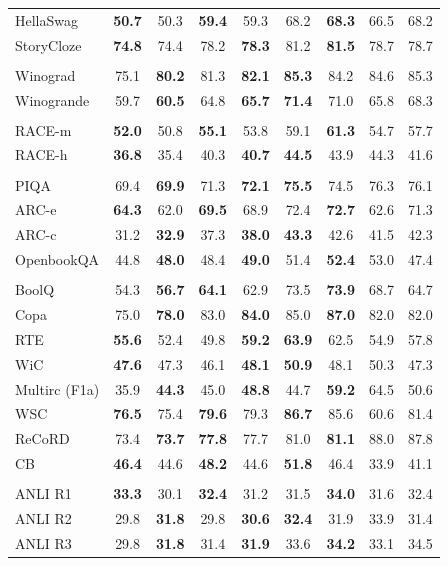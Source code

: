 \documentclass{article}
\begin{document}
\begin{table}
{\begin{tabular}{l|cc|cc|cc|cc}
    HellaSwag & \textbf{50.7} & 50.3 & \textbf{59.4} & 59.3 & 68.2 & \textbf{68.3} & 66.5 & 68.2 \\
    StoryCloze & \textbf{74.8} & 74.4 & 78.2 & \textbf{78.3} & 81.2 & \textbf{81.5} & 78.7 & 78.7 \\ \\
    Winograd & 75.1 & \textbf{80.2} & 81.3 & \textbf{82.1} & \textbf{85.3} & 84.2 & 84.6 & 85.3 \\
    Winogrande & 59.7 & \textbf{60.5} & 64.8 & \textbf{65.7} & \textbf{71.4} & 71.0 & 65.8 & 68.3 \\ \\
    RACE-m & \textbf{52.0} & 50.8 & \textbf{55.1} & 53.8 & 59.1 & \textbf{61.3} & 54.7 & 57.7 \\
    RACE-h & \textbf{36.8} & 35.4 & 40.3 & \textbf{40.7} & \textbf{44.5} & 43.9 & 44.3 & 41.6 \\ \\
    PIQA & 69.4 & \textbf{69.9} & 71.3 & \textbf{72.1} & \textbf{75.5} & 74.5 & 76.3 & 76.1 \\
    ARC-e & \textbf{64.3} & 62.0 & \textbf{69.5} & 68.9 & 72.4 & \textbf{72.7} & 62.6 & 71.3 \\
    ARC-c & 31.2 & \textbf{32.9} & 37.3 & \textbf{38.0} & \textbf{43.3} & 42.6 & 41.5 & 42.3 \\
    OpenbookQA & 44.8 & \textbf{48.0} & 48.4 & \textbf{49.0} & 51.4 & \textbf{52.4} & 53.0 & 47.4 \\ \\
    BoolQ & 54.3 & \textbf{56.7} & \textbf{64.1} & 62.9 & 73.5 & \textbf{73.9} & 68.7 & 64.7 \\
    Copa & 75.0 & \textbf{78.0} & 83.0 & \textbf{84.0} & 85.0 & \textbf{87.0} & 82.0 & 82.0 \\
    RTE & \textbf{55.6} & 52.4 & 49.8 & \textbf{59.2} & \textbf{63.9} & 62.5 & 54.9 & 57.8 \\
    WiC & \textbf{47.6} & 47.3 & 46.1 & \textbf{48.1} & \textbf{50.9} & 48.1 & 50.3 & 47.3 \\
    Multirc (F1a) & 35.9 & \textbf{44.3} & 45.0 & \textbf{48.8} & 44.7 & \textbf{59.2} & 64.5 & 50.6 \\
    WSC & \textbf{76.5} & 75.4 & \textbf{79.6} & 79.3 & \textbf{86.7} & 85.6 & 60.6 & 81.4 \\
    ReCoRD & 73.4 & \textbf{73.7} & \textbf{77.8} & 77.7 & 81.0 & \textbf{81.1} & 88.0 & 87.8 \\
    CB & \textbf{46.4} & 44.6 & \textbf{48.2} & 44.6 & \textbf{51.8} & 46.4 & 33.9 & 41.1 \\ \\
    ANLI R1 & \textbf{33.3} & 30.1 & \textbf{32.4} & 31.2 & 31.5 & \textbf{34.0} & 31.6 & 32.4 \\
    ANLI R2 & 29.8 & \textbf{31.8} & 29.8 & \textbf{30.6} & \textbf{32.4} & 31.9 & 33.9 & 31.4 \\
    ANLI R3 & 29.8 & \textbf{31.8} & 31.4 & \textbf{31.9} & 33.6 & \textbf{34.2} & 33.1 & 34.5 \\ \midrule
    

\end{tabular}}
\end{table}
\end{document}
